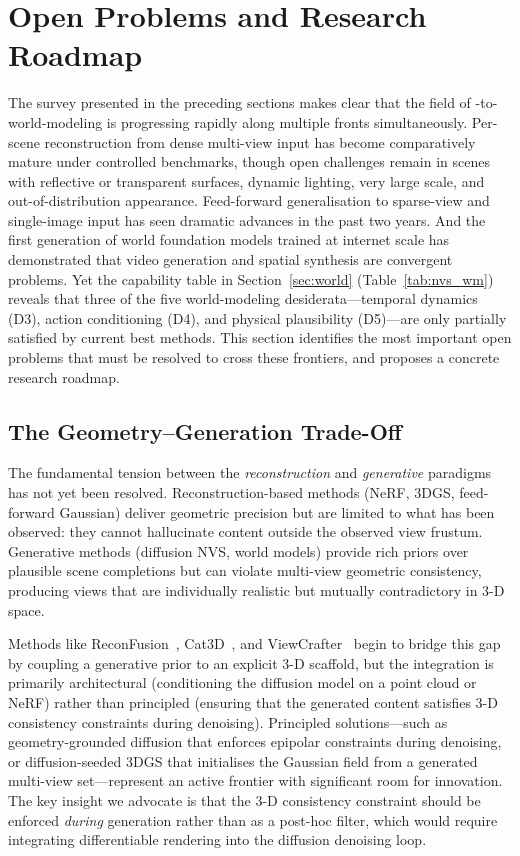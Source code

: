 \section{Open Problems and Research Roadmap}
\label{sec:open}

The survey presented in the preceding sections makes clear that the field of
\nvs{}-to-world-modeling is progressing rapidly along multiple fronts simultaneously.
Per-scene reconstruction from dense multi-view input has become comparatively mature under controlled benchmarks, though open challenges remain in scenes with reflective or transparent surfaces, dynamic lighting, very large scale, and out-of-distribution appearance.
Feed-forward generalisation to sparse-view and single-image input has
seen dramatic advances in the past two years.
And the first generation of world foundation models trained at internet scale
has demonstrated that video generation and spatial synthesis are convergent problems.
Yet the capability table in Section~\ref{sec:world} (Table~\ref{tab:nvs_wm})
reveals that three of the five world-modeling desiderata---temporal dynamics
(D3), action conditioning (D4), and physical plausibility (D5)---are only
partially satisfied by current best methods.
This section identifies the most important open problems that must be resolved
to cross these frontiers, and proposes a concrete research roadmap.

\subsection{The Geometry--Generation Trade-Off}

The fundamental tension between the \emph{reconstruction} and \emph{generative}
paradigms has not yet been resolved.
Reconstruction-based methods (NeRF, 3DGS, feed-forward Gaussian) deliver
geometric precision but are limited to what has been observed: they cannot
hallucinate content outside the observed view frustum.
Generative methods (diffusion NVS, world models) provide rich priors over
plausible scene completions but can violate multi-view geometric consistency,
producing views that are individually realistic but mutually contradictory in
3-D space.

Methods like ReconFusion~\citep{wu2024reconfusion},
Cat3D~\citep{gao2024cat3d}, and ViewCrafter~\citep{yu2024viewcrafter}
begin to bridge this gap by coupling a generative prior to an explicit 3-D
scaffold, but the integration is primarily architectural (conditioning the
diffusion model on a point cloud or NeRF) rather than principled (ensuring
that the generated content satisfies 3-D consistency constraints during
denoising).
Principled solutions---such as geometry-grounded diffusion that enforces
epipolar constraints during denoising, or diffusion-seeded 3DGS that
initialises the Gaussian field from a generated multi-view set---represent
an active frontier with significant room for innovation.
The key insight we advocate is that the 3-D consistency constraint should
be enforced \emph{during} generation rather than as a post-hoc filter,
which would require integrating differentiable rendering into the
diffusion denoising loop.

